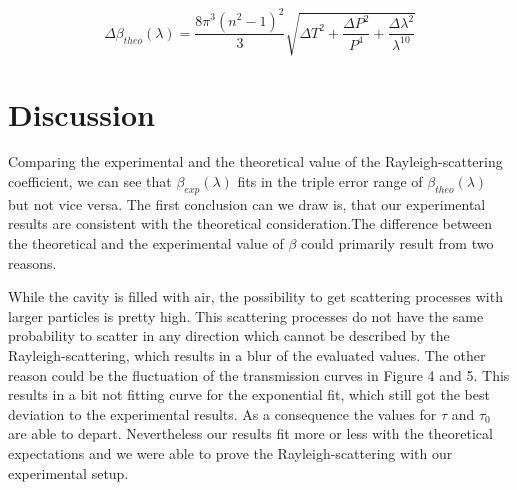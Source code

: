 \documentclass[10pt,a4paper]{article}
\begin{document}
\begin{equation}
\Delta \beta_{theo} (\lambda) = \frac{8\pi ^{3}(n^{2}-1)^{2}}{3}\sqrt{\Delta T^{2} + \frac{\Delta P^{2}}{P^{4}}+ \frac{\Delta \lambda^{2}}{\lambda^{10}}}
\end{equation}

\section{Discussion}

Comparing the experimental and the theoretical value of the Rayleigh-scattering coefficient, we can see that $\beta_{exp}(\lambda)$ fits in the triple error range of $\beta_{theo}(\lambda)$ but not vice versa. The first conclusion can we draw is, that our experimental results are consistent with the theoretical consideration.The difference between the theoretical and the experimental value of $ \beta$ could primarily result from two reasons.

While the cavity is filled with air, the possibility to get scattering processes with larger particles is pretty high. This scattering processes do not have the same probability to scatter in any direction which cannot be described by the Rayleigh-scattering, which results in a blur of the evaluated values. The other reason could be the fluctuation of the transmission curves in Figure 4 and 5. This results in a bit not fitting curve for the exponential fit, which still got the best deviation to the experimental results. As a consequence the values for $\tau$ and $\tau_{0}$ are able to depart. 
Nevertheless our results fit more or less with the theoretical expectations and we were able to prove the Rayleigh-scattering with our experimental setup.
\end{document}
